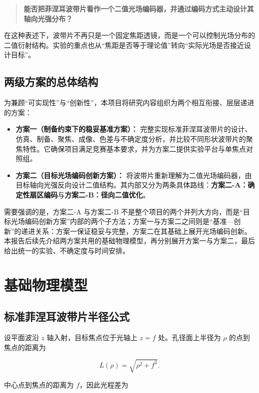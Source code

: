 \documentclass[UTF8,a4paper,11pt]{ctexart}
\begin{document}
\begin{quote}
\textbf{能否把菲涅耳波带片看作一个二值光场编码器，并通过编码方式主动设计其轴向光强分布？}
\end{quote}

在这种表述下，波带片不再只是一个固定焦距透镜，而是一个可以控制光场分布的二值衍射结构。实验的重点也从“焦距是否等于理论值”转向“实际光场是否接近设计目标”。

\subsection{两级方案的总体结构}

为兼顾“可实现性”与“创新性”，本项目将研究内容组织为两个相互衔接、层层递进的方案：

\begin{itemize}[leftmargin=2.4em]
\item \textbf{方案一（制备约束下的稳妥基准方案）：} 完整实现标准菲涅耳波带片的设计、仿真、制备、聚焦、成像、色差与不确定度分析，并比较不同形状波带片的聚焦特性。它确保项目满足竞赛基本要求，并为方案二提供实验平台与单焦点对照组。
\item \textbf{方案二（目标光场编码创新方案）：} 将波带片重新理解为二值光场编码器，由目标轴向光强反向设计二值结构。其内部又分为两条具体路线：\textbf{方案二-A：确定性扇区编码}与\textbf{方案二-B：径向二值优化}。
\end{itemize}

需要强调的是，方案二-A 与方案二-B 不是整个项目的两个并列大方向，而是“目标光场编码创新方案”内部的两个子方法；方案一与方案二之间则是“基准—创新”的递进关系：方案一保证稳妥与完整，方案二在其基础上展开光场编码创新。本报告后续先介绍两方案共用的基础物理模型，再分别展开方案一与方案二，最后给出统一的实验、不确定度与时间安排。

\section{基础物理模型}

\subsection{标准菲涅耳波带片半径公式}

设平面波沿 $z$ 轴入射，目标焦点位于光轴上 $z=f$ 处。孔径面上半径为 $\rho$ 的点到焦点的距离为

\[
L(\rho)=\sqrt{\rho^2+f^2}.
\]

中心点到焦点的距离为 $f$，因此光程差为
\end{document}
